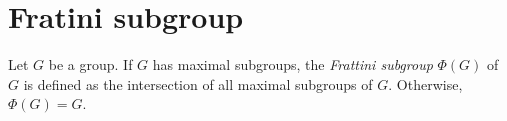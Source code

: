 %

%
%
%

\section{Fratini subgroup}

Let $G$ be a group. If $G$ has maximal subgroups, the {\em Frattini subgroup}
$\Phi(G)$ of $G$ is defined as the intersection of all maximal subgroups of $G$. 
Otherwise, $\Phi(G)=G$. 


